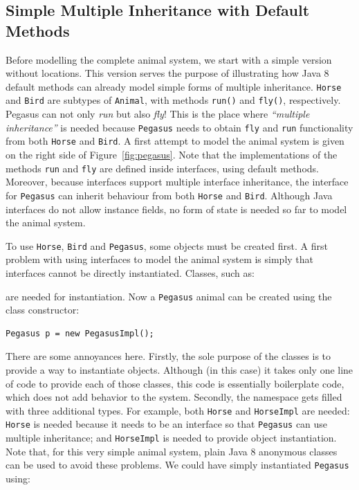 \subsection{Simple Multiple Inheritance with Default
  Methods}\label{sec:simple}

Before modelling the complete animal system, we  start with a
simple version without locations. This version serves the purpose of illustrating how
Java 8 default methods can already model simple forms of multiple inheritance.
\texttt{Horse} and \texttt{Bird} are subtypes
of \texttt{Animal}, with methods \texttt{run()} and \texttt{fly()},
respectively. Pegasus can not only \emph{run} but also \emph{fly}! This is the
place where \emph{``multiple inheritance''} is needed because
\texttt{Pegasus} needs to obtain \texttt{fly} and \texttt{run}
functionality from both \texttt{Horse} and \texttt{Bird}.
A first attempt to model the animal system is given on the right side
of Figure~\ref{fig:pegasus}.
Note that the implementations of the methods \texttt{run}
and \texttt{fly} are defined inside interfaces, using default
methods. Moreover, because interfaces support multiple interface
inheritance, the interface for \texttt{Pegasus} can inherit behaviour
from both \texttt{Horse} and \texttt{Bird}. Although Java interfaces
do not allow instance fields, no form of state is needed so far to
model the animal system.

To use \texttt{Horse}, \texttt{Bird} and \texttt{Pegasus}, some
objects must be created first. A first problem with using
interfaces to model the animal system is simply that interfaces
cannot be directly instantiated. Classes, such as:


\noindent are needed for instantiation. Now a \texttt{Pegasus} animal can be created
using the class constructor:

\begin{lstlisting}
Pegasus p = new PegasusImpl();
\end{lstlisting}

\noindent There are some annoyances here. Firstly, the sole
purpose of the classes is to provide a way to instantiate
objects. Although (in this case) it takes only one line of code to
provide each of those classes, this code is essentially boilerplate
code, which does not add behavior to the system. Secondly,
the namespace gets filled with three additional types. For example,
both \texttt{Horse} and \texttt{HorseImpl} are needed: \texttt{Horse}
is needed because it needs to be an interface so that \texttt{Pegasus}
can use multiple inheritance; and \texttt{HorseImpl} is needed to
provide object instantiation.
Note that, for this very simple animal system, plain Java 8 anonymous
classes can be used to avoid these problems.  We could have simply
instantiated \texttt{Pegasus} using:

